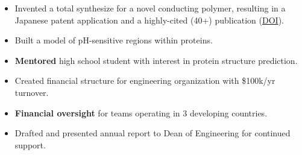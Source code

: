 \documentclass[margin]{res}
\begin{document}
\begin{sloppypar}
\begin{resume}
\begin{itemize}
    \item Invented a total synthesize for a novel conducting polymer, resulting in a Japanese patent application and a highly-cited (40+) publication (\href{http://pubs.acs.org/doi/abs/10.1021/ja107444m}{DOI}).
\end{itemize}

\begin{itemize}
    \item Built a model of pH-sensitive regions within proteins.
    \item \textbf{Mentored} high school student with interest in protein structure prediction.
\end{itemize}


\pagebreak
{}
\begin{itemize}
        \item Created financial structure for engineering organization with \$100k/yr turnover. 
        \item \textbf{Financial oversight} for teams operating in 3 developing countries.
        \item Drafted and presented annual report to Dean of Engineering for continued support. 
\end{itemize}


\end{resume}
\end{sloppypar}
\end{document}
